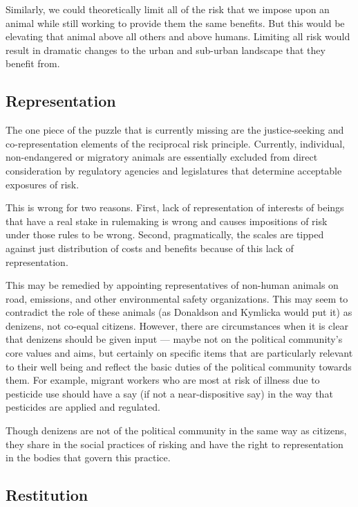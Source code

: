 Similarly, we could theoretically limit all of the risk that we impose upon an
animal while still working to provide them the same benefits. But this would be
elevating that animal above all others and above humans. Limiting all risk
would result in dramatic changes to the urban and sub-urban landscape that they
benefit from.

\subsection{Representation}

The one piece of the puzzle that is currently missing are the justice-seeking
and co-representation elements of the reciprocal risk principle. Currently,
individual, non-endangered or migratory animals are essentially excluded from
direct consideration by regulatory agencies and legislatures that determine
acceptable exposures of risk.

This is wrong for two reasons. First, lack of representation of interests of
beings that have a real stake in rulemaking is wrong and causes impositions of
risk under those rules to be wrong. Second, pragmatically, the scales are
tipped against just distribution of costs and benefits because of this lack of
representation.

This may be remedied by appointing representatives of non-human animals on
road, emissions, and other environmental safety organizations. This may seem to
contradict the role of these animals (as Donaldson and Kymlicka would put it)
as denizens, not co-equal citizens. However, there are circumstances when it is
clear that denizens should be given input --- maybe not on the political
community’s core values and aims, but certainly on specific items that are
particularly relevant to their well being and reflect the basic duties of the
political community towards them. For example, migrant workers who are most at
risk of illness due to pesticide use should have a say (if not a
near-dispositive say) in the way that pesticides are applied and regulated.

Though denizens are not of the political community in the same way as citizens,
they share in the social practices of risking and have the right to
representation in the bodies that govern this practice.

\subsection{Restitution}

